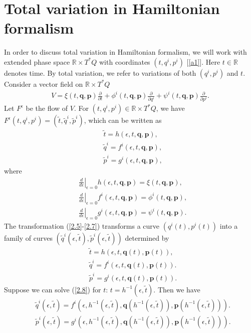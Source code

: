 \documentclass[a4paper,a4paper]{article}
\def\sect#1{\section{#1}\setcounter{equation}{0}}
\def\q{\boldsymbol{q}}
\def\p{\boldsymbol{p}}
\begin{document}


\sect{Total variation in Hamiltonian formalism }

In order to discuss total variation in Hamiltonian formalism, we
will work with extended phase space $\mathbb{R}\times T^{*}Q$ with
coordinates $ (t, q^{i}, p^{i})$ [\ref{a1}]. Here $t \in
\mathbb{R}$ denotes time. %
By total
variation, we refer to variations of both $(q^{i}, p^{i})$ and
$t$. Consider a  vector field on $\mathbb{R}\times T^{*}Q$
\begin{align}
 V=\xi(t,\q, \p)\frac{\partial}{\partial t}
    +\phi^{i}(t,\q, \p)\frac{\partial}{\partial q^{i}}
     +\psi^{i}(t,\q, \p)\frac{\partial}{\partial p^{i}}.  \label{2.1}
\end{align}
\noindent
Let $F^{\epsilon}$ be the flow of $V$. For $(t,q^{i}, p^{i})\in \mathbb{R}\times T^{*}Q$,
 we have $F^{\epsilon}(t, q^{i}, p^{i})=(\tilde{t}, \tilde{q}^{i},
 \tilde{p}^{i})$, which can be written as
\begin{align}
  &\tilde{t}=h(\epsilon, t, \q, \p),\label{2.2}\\
  &\tilde{q}^{i}=f^{i}(\epsilon, t, \q, \p),  \label{2.3}\\
  &\tilde{p}^{i}=g^{i}(\epsilon, t, \q, \p),  \label{2.4}
\end{align}
where
\begin{align}
   &\left.\frac{d}{d\epsilon}\right|_{\epsilon=0}h(\epsilon, t, \q, \p)
            =\xi(t,\q, \p), \label{2.5}\\
   &\left.\frac{d}{d\epsilon}\right|_{\epsilon=0}f^{i}(\epsilon, t, \q, \p)
            =\phi^{i}(t,\q, \p), \label{2.6}\\
   &\left.\frac{d}{d\epsilon}\right|_{\epsilon=0}g^{i}(\epsilon, t, \q, \p)
            =\psi^{i}(t,\q, \p). \label{2.7}
\end{align}
 The transformation (\ref{2.5}-\ref{2.7}) transforms a curve
$(q^{i}(t), p^{i}(t))$  into a family of curves $(\tilde{q}^{i}(\epsilon,
\tilde{t}), \tilde{p}^{i}(\epsilon, \tilde{t}))$  determined by
\begin{align}
  &\tilde{t}=h(\epsilon, t, \q(t), \p(t)),\label{2.8} \\
  &\tilde{q}^{i}=f^{i}(\epsilon, t, \q(t), \p(t)).  \label{2.9}\\
  &\tilde{p}^{i}=g^{i}(\epsilon, t, \q(t), \p(t)).  \label{2.10}
\end{align}
Suppose we can solve (\ref{2.8}) for $t$: $t=h^{-1}(\epsilon,
\tilde{t})$. Then we have
\begin{align}
 &\tilde{q}^{i}(\epsilon, \tilde{t})=f^{i}(\epsilon, h^{-1}(\epsilon, \tilde{t}),
 \q(h^{-1}(\epsilon, \tilde{t})), \p(h^{-1}(\epsilon, \tilde{t}))). \label{2.11}\\
&\tilde{p}^{i}(\epsilon, \tilde{t})=g^{i}(\epsilon, h^{-1}(\epsilon, \tilde{t}),
 \q(h^{-1}(\epsilon, \tilde{t})), \p(h^{-1}(\epsilon, \tilde{t}))). \label{2.12}
\end{align}
\end{document}
